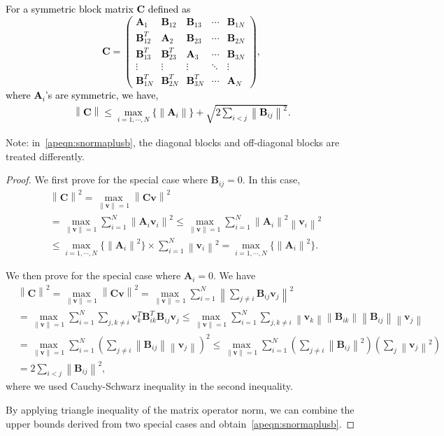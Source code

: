 \documentclass[twoside,11pt]{article}
\newcommand{\revise}[1]{\textcolor{black}{ #1}}
\newcommand{\norm}[1]{\left\lVert#1\right\rVert}
\newcommand{\matA}{\mathbf{A}}
\newcommand{\matB}{\mathbf{B}}
\newcommand{\matC}{\mathbf{C}}
\newcommand{\vecv}{\mathbf{v}}
\begin{document}
\revise{\begin{lemma}
\label{lm:blockmatrixopnormupperbound}
    For a symmetric block matrix $\matC$ defined as
    \begin{equation}
\matC = 
\begin{pmatrix}
\matA_1   & \matB_{12}     & \matB_{13}   &\cdots & \matB_{1N}\\
\matB_{12}^T & \matA_2     & \matB_{23}     &\cdots & \matB_{2N}\\
\matB_{13}^T & \matB_{23}^T       & \matA_3   &\cdots & \matB_{3N}\\
\vdots     &\vdots   &\vdots &\ddots & \vdots\\
\matB_{1N}^T & \matB_{2N}^T       & \matB_{3N}^T     &\cdots & \matA_N
\end{pmatrix},
\end{equation}
where $\matA_{i}$'s are symmetric, we have,
\begin{align}
\label{apeqn:snormaplusb}
    \norm{\matC}\le \max_{i=1,\cdots,N}\{\norm{\matA_i}\}+\sqrt{2\sum_{i< j}\norm{\matB_{ij}}^2}.
\end{align}
\end{lemma}}
Note: in~\eqref{apeqn:snormaplusb}, the diagonal blocks and off-diagonal blocks are treated differently.
\begin{proof}
    We first prove for the special case where $\matB_{ij}=0$. In this case, 
    \begin{align*}
    &\norm{\matC}^2=\max_{\norm{\vecv}=1}\norm{\matC\vecv}^2\\
    &=\max_{\norm{\vecv}=1}\sum_{i=1}^N\norm{\matA_i\vecv_i}^2\le \max_{\norm{\vecv}=1}\sum_{i=1}^N\norm{\matA_i}^2\norm{\vecv_i}^2\\
    &\le \max_{i=1,\cdots,N}\{\norm{\matA_i}^2\}\times\sum_{i=1}^N\norm{\vecv_i}^2=\max_{i=1,\cdots,N}\{\norm{\matA_i}^2\}.
    \end{align*}

We then prove for the special case where $\matA_i=0$. We have
\begin{align*}
    &\norm{\matC}^2=\max_{\norm{\vecv}=1}\norm{\matC\vecv}^2=\max_{\norm{\vecv}=1}\sum_{i=1}^N\norm{\sum_{j\neq i}\matB_{ij}\vecv_j}^2\\
    &=\max_{\norm{\vecv}=1}\sum_{i=1}^N\sum_{j,k\neq i}\vecv_k^T\matB_{ik}^T\matB_{ij}\vecv_j\le \max_{\norm{\vecv}=1}\sum_{i=1}^N\sum_{j,k\neq i}\norm{\vecv_k}\norm{\matB_{ik}}\norm{\matB_{ij}}\norm{\vecv_j}\\
    &= \max_{\norm{\vecv}=1}\sum_{i=1}^N\left(\sum_{j\neq i}\norm{\matB_{ij}}\norm{\vecv_j}\right)^2\le \max_{\norm{\vecv}=1}\sum_{i=1}^N \left(\sum_{j\neq i}\norm{\matB_{ij}}^2 \right)\left(\sum_{j}\norm{\vecv_{j}}^2 \right)\\
    &=2\sum_{i<j}\norm{\matB_{ij}}^2,
\end{align*}
where we used Cauchy-Schwarz inequality in the second inequality.

By applying triangle inequality of the matrix operator norm, we can combine the upper bounds derived from two special cases and obtain~\eqref{apeqn:snormaplusb}.
\end{proof}
\vskip 0.2in

\end{document}
